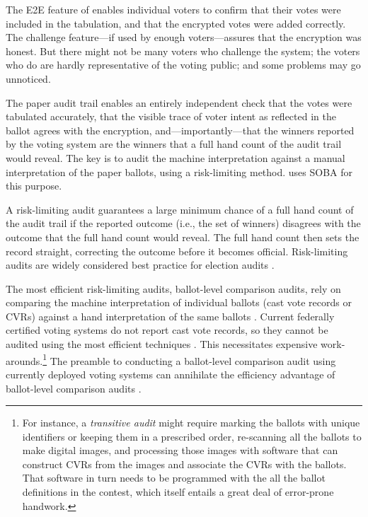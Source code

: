 \label{sec:audit}

The E2E feature of \projname enables individual voters to confirm that their votes were included in the
tabulation, and that the encrypted votes were added correctly.
The challenge feature---if used by enough voters---assures that the encryption was honest.
But there might not be many voters who challenge the system; the voters who do are hardly
representative of the voting public; and some problems may go unnoticed.

The paper audit trail enables an entirely independent check that the votes were tabulated accurately, that
the visible trace of voter intent as reflected in the ballot agrees with the encryption, and---importantly---that
the winners reported by the voting system are the winners that a full hand count of the audit trail would
reveal.
The key is to audit the machine interpretation against a manual interpretation of the paper ballots,
using a risk-limiting method.
\projname uses SOBA \cite{benalohEtal11} for this purpose.

A risk-limiting audit guarantees a large minimum chance of a full hand count of the audit trail if the
reported outcome (i.e., the set of winners) disagrees with the outcome that the full hand count would reveal.
The full hand count then sets the record straight, correcting the outcome before it becomes official.
Risk-limiting audits are widely considered best practice for election audits \cite{bestPractices08}.

The most efficient risk-limiting audits, ballot-level comparison audits, rely on comparing 
the machine interpretation of individual ballots
(cast vote records or CVRs) 
against a hand interpretation of the same ballots \cite{stark10d,benalohEtal11,lindemanStark12}.
Current federally certified voting systems do not report cast vote records, so they cannot
be audited using the most efficient techniques \cite{lindemanStark12,starkWagner12}.
This necessitates expensive work-arounds.\footnote{%
    For instance, a {\em transitive audit\/} might require marking the ballots with unique identifiers
    or keeping them in a prescribed order, re-scanning all the ballots to make digital images,
    and processing those images with software that can construct CVRs from the images and
   associate the CVRs with the ballots.
   That software in turn needs to be programmed with the all the ballot definitions in the contest,
    which itself entails a great deal of error-prone handwork.
}
The preamble to conducting a ballot-level comparison audit using currently deployed voting systems
can annihilate the efficiency advantage of ballot-level comparison
audits \cite{starkWagner12}.

